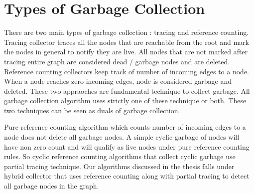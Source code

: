 \begin{comment}
Every block of memory that represents a data is generally referred as object in object oriented programming langauges. In this thesis, we abstract the environment into graph theoretic concepts. 
Every object allocated in the heap can be mapped in to nodes. Nodes are represent by circle in the graph. An object might contain references to other objects in the heaps. These references are unidirectional references. These references can be modeled as directed edges in the graph. So the nodes have arc followed by an arrow. The directional edge represent which objects stores the references. The arc ending with no arrow saves the references of the node with arrow. So the relationship among objects in the heap can be modeled in to nodes and edges. Roots in the stack memory and static memory can be modeled in to separate nodes or a single node. The unique property of the root node(s) (R) is/are they never contain an incoming edge. The roots are inaccesible by the objects in the heap or by other roots. So this creates a unique property among the nodes. So R only contains directional edges that points to other nodes. 
\end{comment}

\section{Types of Garbage Collection}

There are two main types of garbage collection : tracing and reference counting. Tracing collector traces all the nodes that are reachable from the root and mark the nodes in general to notify they are live. All nodes that are not marked after tracing entire graph are considered dead / garbage nodes and are deleted. Reference counting collectors keep track of number of incoming edges to a node. When a node reaches zero incoming edges, node is considered garbage and deleted. These two appraoches are fundamental technique to collect garbage. All garbage collection algorithm uses strictly one of these technique or both. These two techniques can be seen as duals of garbage collection.

Pure reference counting algorithm which counts number of incoming edges to a node does not delete all garbage nodes. A simple cyclic garbage of nodes will have non zero count and will qualify as live nodes under pure reference counting rules. So cyclic reference counting algorithms that collect cyclic garbage use partial tracing technique. Our algorithms discussed in the thesis falls under hybrid collector that uses reference counting along with partial tracing to detect all garbage nodes in the graph.

